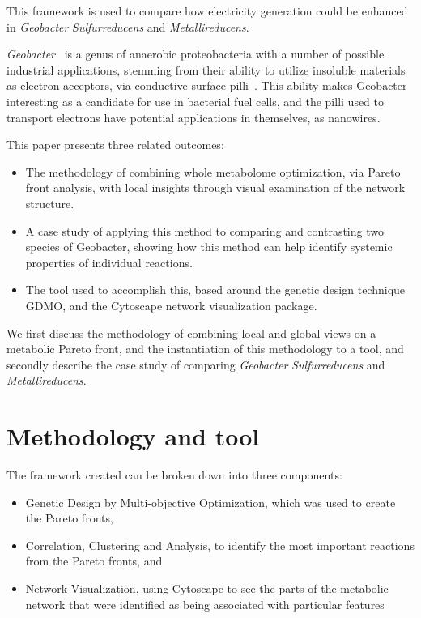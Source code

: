 \documentclass[a4paper]{article}
\begin{document}
This framework is used to compare how electricity generation could be enhanced in {\it Geobacter} {\it Sulfurreducens} and {\it Metallireducens}.

{\it Geobacter}~\cite{Lovley2011} is a genus of anaerobic proteobacteria with a number of possible industrial applications, stemming from their ability to utilize insoluble materials as electron acceptors, via conductive surface pilli~\cite{Bond2003}. This ability makes Geobacter interesting as a candidate for use in bacterial fuel cells, and the pilli used to transport electrons have potential applications in themselves, as nanowires.

This paper presents three related outcomes:
\begin{itemize}
	\item The methodology of combining whole metabolome optimization, via Pareto front analysis, with local insights through visual examination of the network structure.
	\item A case study of applying this method to comparing and contrasting two species of Geobacter, showing how this method can help identify systemic properties of individual reactions.
	\item The tool used to accomplish this, based around the genetic design technique GDMO, and the Cytoscape network visualization package.
\end{itemize}

We first discuss the methodology of combining local and global views on a metabolic Pareto front, and the instantiation of this methodology to a tool, and secondly describe the case study of comparing {\it Geobacter} {\it Sulfurreducens} and {\it Metallireducens}.

\section{Methodology and tool}
The framework created can be broken down into three components: 
\begin{itemize}
\item Genetic Design by Multi-objective Optimization, which was used to create the Pareto fronts,
\item Correlation, Clustering and Analysis, to identify the most important reactions from the Pareto fronts, and
\item Network Visualization, using Cytoscape to see the parts of the metabolic network that were identified as being associated with particular features 
\end{itemize}
\end{document}
